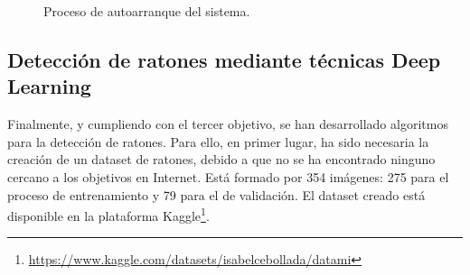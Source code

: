 \begin{figure}[h!]
  \begin{center}
    \hspace{1mm}
    \hspace{1mm}
    \hspace{1mm}
  \end{center}
\caption{Proceso de autoarranque del sistema.} \label{fig:autoarranque}
\end{figure}

\subsection{Detección de ratones mediante técnicas Deep Learning}
Finalmente, y cumpliendo con el tercer objetivo, se han desarrollado algoritmos para la detección de ratones. Para ello, en primer lugar, ha sido necesaria la creación de un dataset de ratones, debido a que no se ha encontrado ninguno cercano a los objetivos en Internet. Está formado por 354 imágenes: 275 para el proceso de entrenamiento y 79 para el de validación. El dataset creado está disponible en la plataforma Kaggle\footnote{\url{https://www.kaggle.com/datasets/isabelcebollada/datami}}.\\

